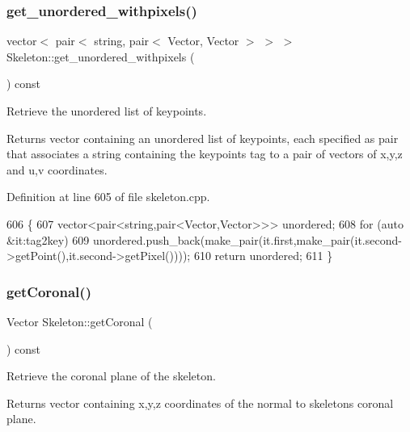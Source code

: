 \subsubsection{\texorpdfstring{get\+\_\+unordered\+\_\+withpixels()}{get\_unordered\_withpixels()}}
{\footnotesize\ttfamily vector$<$ pair$<$ string, pair$<$ Vector, Vector $>$ $>$ $>$ Skeleton\+::get\+\_\+unordered\+\_\+withpixels (\begin{DoxyParamCaption}{ }\end{DoxyParamCaption}) const\hspace{0.3cm}{\ttfamily [virtual]}}



Retrieve the unordered list of keypoints. 

\begin{DoxyReturn}{Returns}
vector containing an unordered list of keypoints, each specified as pair that associates a string containing the keypoint\textquotesingle{}s tag to a pair of vectors of x,y,z and u,v coordinates. 
\end{DoxyReturn}


Definition at line 605 of file skeleton.\+cpp.


\begin{DoxyCode}
606 \{
607     vector<pair<string,pair<Vector,Vector>>> unordered;
608     \textcolor{keywordflow}{for} (\textcolor{keyword}{auto} &it:tag2key)
609         unordered.push\_back(make\_pair(it.first,make\_pair(it.second->getPoint(),it.second->getPixel())));
610     \textcolor{keywordflow}{return} unordered;
611 \}
\end{DoxyCode}
\mbox{\label{classassistive__rehab_1_1Skeleton_aa241a0ac93a9ead198f985073c8935eb}} 
\subsubsection{\texorpdfstring{get\+Coronal()}{getCoronal()}}
{\footnotesize\ttfamily Vector Skeleton\+::get\+Coronal (\begin{DoxyParamCaption}{ }\end{DoxyParamCaption}) const}



Retrieve the coronal plane of the skeleton. 

\begin{DoxyReturn}{Returns}
vector containing x,y,z coordinates of the normal to skeleton\textquotesingle{}s coronal plane. 
\end{DoxyReturn}


